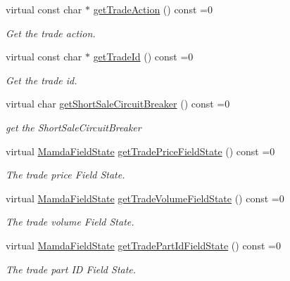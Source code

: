 \begin{CompactItemize}
virtual const char $\ast$ \hyperlink{classWombat_1_1MamdaTradeReport_488ca9ba3b64fd6c0996e0df649c5834}{get\-Trade\-Action} () const =0
\begin{CompactList}\small\item\em Get the trade action. \item\end{CompactList}\item 
virtual const char $\ast$ \hyperlink{classWombat_1_1MamdaTradeReport_8bccbbb68ce93d26fd87db95f2f7ff26}{get\-Trade\-Id} () const =0
\begin{CompactList}\small\item\em Get the trade id. \item\end{CompactList}\item 
virtual char \hyperlink{classWombat_1_1MamdaTradeReport_e772189728321b1bd833baf28e387c15}{get\-Short\-Sale\-Circuit\-Breaker} () const =0
\begin{CompactList}\small\item\em get the Short\-Sale\-Circuit\-Breaker \item\end{CompactList}\item 
virtual \hyperlink{namespaceWombat_93aac974f2ab713554fd12a1fa3b7d2a}{Mamda\-Field\-State} \hyperlink{classWombat_1_1MamdaTradeReport_338b8a504dc519bff3fc7de0cd882423}{get\-Trade\-Price\-Field\-State} () const =0
\begin{CompactList}\small\item\em The trade price Field State. \item\end{CompactList}\item 
virtual \hyperlink{namespaceWombat_93aac974f2ab713554fd12a1fa3b7d2a}{Mamda\-Field\-State} \hyperlink{classWombat_1_1MamdaTradeReport_3ce3d260e50a07bc6b9f93f8f866d973}{get\-Trade\-Volume\-Field\-State} () const =0
\begin{CompactList}\small\item\em The trade volume Field State. \item\end{CompactList}\item 
virtual \hyperlink{namespaceWombat_93aac974f2ab713554fd12a1fa3b7d2a}{Mamda\-Field\-State} \hyperlink{classWombat_1_1MamdaTradeReport_3b5756a75180c823a4908d3d2b820d3a}{get\-Trade\-Part\-Id\-Field\-State} () const =0
\begin{CompactList}\small\item\em The trade part ID Field State. \item\end{CompactList}\item 

\end{CompactItemize}
